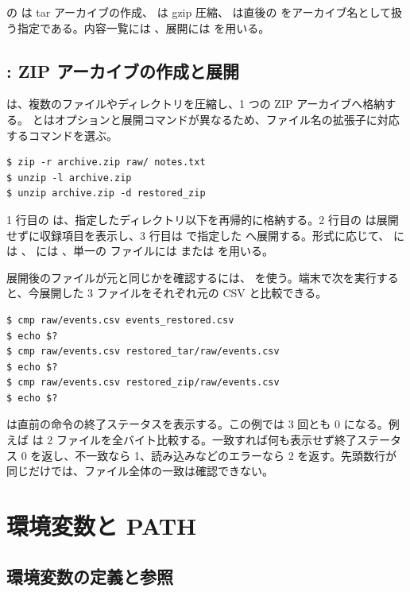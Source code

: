  の  は tar アーカイブの作成、 は gzip 圧縮、 は直後の  をアーカイブ名として扱う指定である。内容一覧には 、展開には  を用いる。

\subsection{: ZIP アーカイブの作成と展開}

 は、複数のファイルやディレクトリを圧縮し、1 つの ZIP アーカイブへ格納する。 とはオプションと展開コマンドが異なるため、ファイル名の拡張子に対応するコマンドを選ぶ。

\begin{lstlisting}[numbers=none, xleftmargin=2\zw]
$ zip -r archive.zip raw/ notes.txt
$ unzip -l archive.zip
$ unzip archive.zip -d restored_zip
\end{lstlisting}

1 行目の  は、指定したディレクトリ以下を再帰的に格納する。2 行目の  は展開せずに収録項目を表示し、3 行目は  で指定した  へ展開する。形式に応じて、 には 、 には 、単一の  ファイルには  または  を用いる。

展開後のファイルが元と同じかを確認するには、 を使う。端末で次を実行すると、今展開した 3 ファイルをそれぞれ元の CSV と比較できる。

\begin{lstlisting}[numbers=none, xleftmargin=2\zw]
$ cmp raw/events.csv events_restored.csv
$ echo $?
$ cmp raw/events.csv restored_tar/raw/events.csv
$ echo $?
$ cmp raw/events.csv restored_zip/raw/events.csv
$ echo $?
\end{lstlisting}

 は直前の命令の終了ステータスを表示する。この例では 3 回とも 0 になる。例えば  は 2 ファイルを全バイト比較する。一致すれば何も表示せず終了ステータス 0 を返し、不一致なら 1、読み込みなどのエラーなら 2 を返す。先頭数行が同じだけでは、ファイル全体の一致は確認できない。

\section{環境変数と PATH}

\subsection{環境変数の定義と参照}

